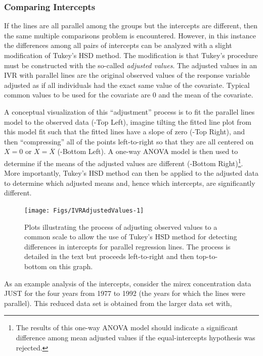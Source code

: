 \documentclass[10pt,openany]{book}\usepackage[]{graphicx}\usepackage[]{color}
\newenvironment{knitrout}{}{} %
\begin{document}
\subsubsection*{Comparing Intercepts}
If the lines are all parallel among the groups but the intercepts are different, then the same multiple comparisons problem is encountered.  However, in this instance the differences among all pairs of intercepts can be analyzed with a slight modification of Tukey's HSD method.  The modification is that Tukey's procedure must be constructed with the so-called \emph{adjusted values}.  The adjusted values in an IVR with parallel lines are the original observed values of the response variable adjusted as if all individuals had the exact same value of the covariate.  Typical common values to be used for the covariate are 0 and the mean of the covariate.

A conceptual visualization of this ``adjustment'' process is to fit the parallel lines model to the observed data (-Top Left), imagine tilting the fitted line plot from this model fit such that the fitted lines have a slope of zero (-Top Right), and then ``compressing'' all of the points left-to-right so that they are all centered on $X=0$ or $X=\overline{X}$ (-Bottom Left).  A one-way ANOVA model is then used to determine if the means of the adjusted values are different (-Bottom Right)\footnote{The results of this one-way ANOVA model should indicate a significant difference among mean adjusted values if the equal-intercepts hypothesis was rejected.}.  More importantly, Tukey's HSD method can then be applied to the adjusted data to determine which adjusted means and, hence which intercepts, are significantly different.

\begin{knitrout}
\color{fgcolor}\begin{figure}[h]

{\centering \texttt{[image: Figs/IVRAdjustedValues-1]} 

}

\caption[Plots illustrating the process of adjusting observed values to a common scale to allow the use of Tukey's HSD method for detecting differences in intercepts for parallel regression lines]{Plots illustrating the process of adjusting observed values to a common scale to allow the use of Tukey's HSD method for detecting differences in intercepts for parallel regression lines.  The process is detailed in the text but proceeds left-to-right and then top-to-bottom on this graph.}\label{fig:IVRAdjustedValues}
\end{figure}


\end{knitrout}
\vspace{9pt}
As an example analysis of the intercepts, consider the mirex concentration data JUST for the four years from 1977 to 1992 (the years for which the lines were parallel).  This reduced data set is obtained from the larger data set with,
\end{document}
